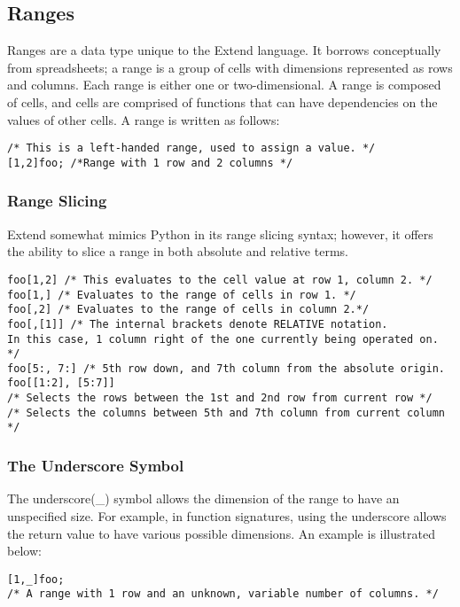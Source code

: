 	\subsection{Ranges}
		Ranges are a data type unique to the Extend language. It borrows conceptually from spreadsheets; a range is a group of cells with dimensions represented as rows and columns. Each range is either one or two-dimensional. A range is composed of cells, and cells are comprised of functions that can have dependencies on the values of other cells. 
		A range is written as follows:
		\begin{lstlisting}
/* This is a left-handed range, used to assign a value. */
[1,2]foo; /*Range with 1 row and 2 columns */
		\end{lstlisting}
		\subsubsection{Range Slicing}
			Extend somewhat mimics Python in its range slicing syntax; however, it offers the ability to slice a range in both absolute and relative terms.
			\begin{lstlisting}
foo[1,2] /* This evaluates to the cell value at row 1, column 2. */
foo[1,] /* Evaluates to the range of cells in row 1. */
foo[,2] /* Evaluates to the range of cells in column 2.*/
foo[,[1]] /* The internal brackets denote RELATIVE notation. 
In this case, 1 column right of the one currently being operated on. */ 
foo[5:, 7:] /* 5th row down, and 7th column from the absolute origin.
foo[[1:2], [5:7]] 
/* Selects the rows between the 1st and 2nd row from current row */
/* Selects the columns between 5th and 7th column from current column */
			\end{lstlisting}
		\subsubsection{The Underscore Symbol}
			The underscore(\_) symbol allows the dimension of the range to have an unspecified size. For example, in function signatures, using the underscore allows the return value to have various possible dimensions. An example is illustrated below:
			\begin{lstlisting}
[1,_]foo; 
/* A range with 1 row and an unknown, variable number of columns. */
			\end{lstlisting}
